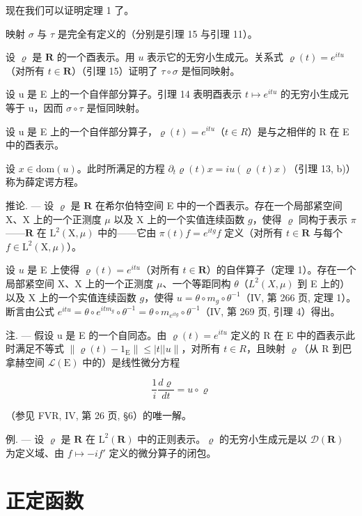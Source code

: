 现在我们可以证明定理 1 了。

映射 \(\sigma\) 与 \(\tau\) 是完全有定义的（分别是引理 15 与引理 11）。

设 \(\varrho\) 是 \(\mathbf{R}\) 的一个酉表示。用 \(u\) 表示它的无穷小生成元。关系式 \(\varrho(t) = e^{itu}\)（对所有 \(t \in \mathbf{R}\)）（引理 15）证明了 \(\tau \circ \sigma\) 是恒同映射。

设 u 是 E 上的一个自伴部分算子。引理 14 表明酉表示 \(t \mapsto e^{itu}\) 的无穷小生成元等于 u，因而 \(\sigma \circ \tau\) 是恒同映射。

设 u 是 E 上的一个自伴部分算子，\(\varrho(t) = e^{itu}\)（\(t \in R\)）是与之相伴的 R 在 E 中的酉表示。

设 \(x \in \text{dom}(u)\)。此时所满足的方程 \(\partial_{t} \varrho(t)x = i u(\varrho(t)x)\)（引理 13, b)）称为薛定谔方程。

推论. --- 设 \(\varrho\) 是 \(\mathbf{R}\) 在希尔伯特空间 E 中的一个酉表示。存在一个局部紧空间 X、X 上的一个正测度 \(\mu\) 以及 X 上的一个实值连续函数 \(g\)，使得 \(\varrho\) 同构于表示 \(\pi\)——\(\mathbf{R}\) 在 \(\mathrm{L}^2 (\mathrm{X},\mu)\) 中的——它由 \(\pi (t)f = e^{itg}f\) 定义（对所有 \(t\in \mathbf{R}\) 与每个 \(f\in \mathrm{L}^2 (\mathrm{X},\mu)\)）。

设 \(u\) 是 E 上使得 \(\varrho(t) = e^{itu}\)（对所有 \(t \in \mathbf{R}\)）的自伴算子（定理 1）。存在一个局部紧空间 X、X 上的一个正测度 \(\mu\)、一个等距同构 \(\theta\)（\(L^2(X, \mu)\) 到 E 上的） 以及 X 上的一个实值连续函数 \(g\)，使得 \(u = \theta \circ m_g \circ \theta^{-1}\)（IV, 第 266 页, 定理 1）。断言由公式 \(e^{itu} = \theta \circ e^{itm_g} \circ \theta^{-1} = \theta \circ m_{e^{itg}} \circ \theta^{-1}\)（IV, 第 269 页, 引理 4）得出。

注. --- 假设 u 是 E 的一个自同态。由 \(\varrho(t) = e^{itu}\) 定义的 R 在 E 中的酉表示此时满足不等式 \(\|\varrho(t) - 1_{\mathrm{E}}\| \leqslant |t||u\|\)，对所有 \(t \in R\)，且映射 \(\varrho\)（从 R 到巴拿赫空间 \(\mathcal{L}(\mathrm{E})\) 中的）是线性微分方程

\[
\frac {1}{i} \frac {d \varrho}{d t} = u \circ \varrho
\]

（参见 FVR, IV, 第 26 页, §6）的唯一解。

例. --- 设 \(\varrho\) 是 \(\mathbf{R}\) 在 \(\mathrm{L}^2 (\mathbf{R})\) 中的正则表示。\(\varrho\) 的无穷小生成元是以 \(\mathcal{D}(\mathbf{R})\) 为定义域、由 \(f\mapsto -if'\) 定义的微分算子的闭包。

\section{正定函数}

